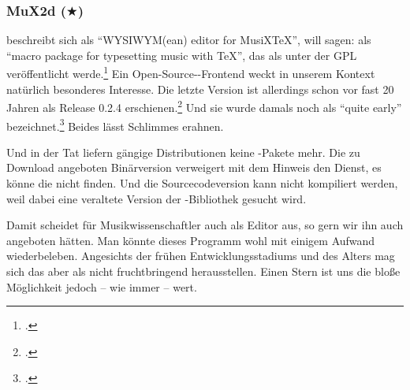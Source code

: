 %
%
%



\subsubsection{MuX2d ($\bigstar$)}

\label{MuX2d} beschreibt sich als \enquote{WYSIWYM(ean) editor for MusiXTeX}, will
sagen: als \enquote{macro package for typesetting music with TeX}, das als unter
der GPL veröffentlicht werde.\footcite[vgl.][\nopage wp]{Mux2d2000a} Ein
Open-Source--Frontend weckt in unserem Kontext natürlich
besonderes Interesse. Die letzte Version ist allerdings schon vor fast 20 Jahren
als Release 0.2.4 erschienen.\footcite[vgl.][\nopage wp]{Mux2d2000b} Und sie
wurde damals noch als \enquote{quite early} bezeichnet.\footcite[vgl.][\nopage
wp]{Mux2d2000a} Beides lässt Schlimmes erahnen.

Und in der Tat liefern gängige Distributionen keine -Pakete mehr. Die
zu Download angeboten Binärversion verweigert mit dem Hinweis den Dienst, es
könne die  nicht finden. Und die Sourcecodeversion kann nicht
kompiliert werden, weil dabei eine veraltete Version der -Bibliothek
gesucht wird.

Damit scheidet für Musikwissenschaftler auch  als Editor aus, so gern
wir ihn auch angeboten hätten. Man könnte dieses Programm wohl mit einigem
Aufwand wiederbeleben. Angesichts der frühen Entwicklungsstadiums und des Alters
mag sich das aber als nicht fruchtbringend herausstellen. Einen Stern ist uns
die bloße Möglichkeit jedoch -- wie immer -- wert.
%
